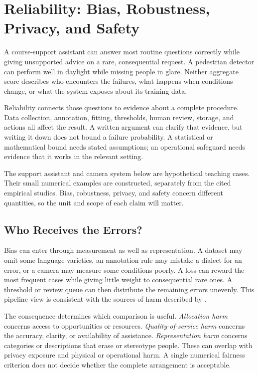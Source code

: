 \begingroup
\raggedbottom
{}
\chapter{Reliability: Bias, Robustness, Privacy, and Safety}
\label{ch:reliability}

A course-support assistant can answer most routine questions correctly while giving unsupported advice on a rare, consequential request. A pedestrian detector can perform well in daylight while missing people in glare. Neither aggregate score describes who encounters the failures, what happens when conditions change, or what the system exposes about its training data.

Reliability connects those questions to evidence about a complete procedure. Data collection, annotation, fitting, thresholds, human review, storage, and actions all affect the result. A written argument can clarify that evidence, but writing it down does not bound a failure probability. A statistical or mathematical bound needs stated assumptions; an operational safeguard needs evidence that it works in the relevant setting.

The support assistant and camera system below are hypothetical teaching cases. Their small numerical examples are constructed, separately from the cited empirical studies. Bias, robustness, privacy, and safety concern different quantities, so the unit and scope of each claim will matter.

\section{Who Receives the Errors?}

Bias can enter through measurement as well as representation. A dataset may omit some language varieties, an annotation rule may mistake a dialect for an error, or a camera may measure some conditions poorly. A loss can reward the most frequent cases while giving little weight to consequential rare ones. A threshold or review queue can then distribute the remaining errors unevenly. This pipeline view is consistent with the sources of harm described by \citet{suresh2021}.

The consequence determines which comparison is useful. \emph{Allocation harm} concerns access to opportunities or resources. \emph{Quality-of-service harm} concerns the accuracy, clarity, or availability of assistance. \emph{Representation harm} concerns categories or descriptions that erase or stereotype people. These can overlap with privacy exposure and physical or operational harm. A single numerical fairness criterion does not decide whether the complete arrangement is acceptable.

